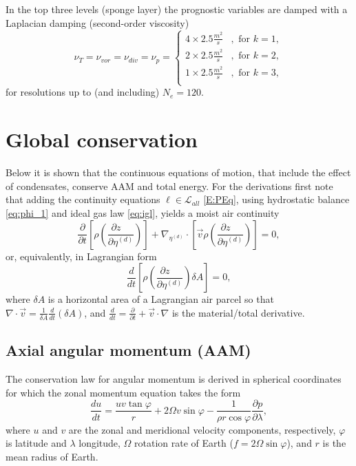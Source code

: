 \documentclass{agujournal}
\begin{document}
{In the top three levels (sponge layer) the prognostic variables are damped with a Laplacian damping (second-order viscosity)
\begin{equation}
\nu_T = \nu_{vor} = \nu_{div} = \nu_p = 
\begin{cases}
4\times 2.5 \frac{m^2}{s}&, \text{ for }k=1,\\
2\times 2.5 \frac{m^2}{s}&, \text{ for }k=2,\\
1\times 2.5 \frac{m^2}{s}&, \text{ for }k=3,\\
\end{cases}
\end{equation}
for resolutions up to (and including) $N_e=120$.
%
\section{Global conservation}\label{app:conservation}
Below it is shown that the continuous equations of motion, that include the effect of condensates, conserve AAM and total energy. For the derivations first note that adding the continuity equations $\ell \in \mathcal{L}_{all} $ \eqref{E:PEq}, using hydrostatic balance \eqref{eq:phi_1} and ideal gas law \eqref{eq:igl}, yields a moist air continuity
\begin{equation}
\frac{\partial }{\partial t}\left[ \rho \left(\frac{\partial z\quad}{\partial \eta^{(d)}}\right)\right]+\nabla_{\eta^{(d)}} \cdot \left[ \vec{v}\rho  \left( \frac{\partial z\quad }{\partial \eta^{(d)}}\right)\right]=0,\label{eq:cont2}
\end{equation}
or, equivalently, in Lagrangian form
\begin{equation}
\frac{d}{dt}\left[ \rho \left( \frac{\partial z\quad }{\partial \eta^{(d)}}\right)\delta A\right]=0,\label{eq:lagra_cont}
\end{equation}
where $\delta A$ is a horizontal area of a Lagrangian air parcel so that $\nabla \cdot \vec{v}=\frac{1}{\delta A}\frac{d}{dt}\left( \delta A\right)$, and  $\frac{d}{dt}=\frac{\partial }{\partial t}+\vec{v}\cdot \nabla $ is the material/total derivative. 
\subsection{Axial angular momentum (AAM)}
The conservation law for angular momentum is derived in spherical coordinates for which the zonal momentum equation takes the form
\begin{equation}
\frac{du}{dt}=\frac{u v \tan \varphi}{r}+2\Omega v\sin \varphi -\frac{1}{\rho r \cos \varphi}\frac{\partial p}{\partial \lambda},\label{eq:tmp200}
\end{equation}
where $u$ and $v$ are the zonal and meridional velocity components, respectively, $\varphi$ is latitude and $\lambda$ longitude, $\Omega$ rotation rate of Earth ($f=2\Omega \sin \varphi$), and $r$ is the mean radius of Earth.\\

}
\end{document}
